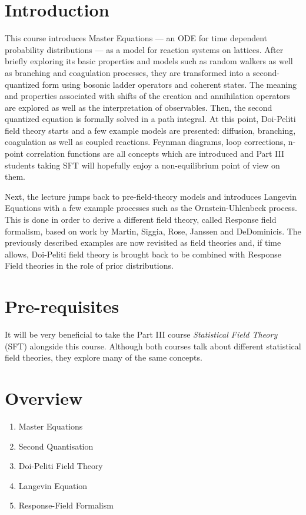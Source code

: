 \documentclass[a4paper,11pt]{article}
\begin{document}
	\maketitlepage
	\preliminaries

	\section*{Introduction}
	
	\noindent This course introduces Master Equations --- an ODE for time dependent probability distributions --- as a model for reaction systems on lattices. After briefly exploring its basic properties and models such as random walkers as well as branching and coagulation processes, they are transformed into a second-quantized form using bosonic ladder operators and coherent states. The meaning and properties associated with shifts of the creation and annihilation operators are explored as well as the interpretation of observables. Then, the second quantized equation is formally solved in a path integral. At this point, Doi-Peliti field theory starts and a few example models are presented: diffusion, branching, coagulation as well as coupled reactions. Feynman diagrams, loop corrections, n-point correlation functions are all concepts which are introduced and Part III students taking SFT will hopefully enjoy a non-equilibrium point of view on them.

	\noindent Next, the lecture jumps back to pre-field-theory models and introduces Langevin Equations with a few example processes such as the Ornstein-Uhlenbeck process. This is done in order to derive a different field theory, called Response field formalism, based on work by Martin, Siggia, Rose, Janssen and DeDominicis. The previously described examples are now revisited as field theories and, if time allows, Doi-Peliti field theory is brought back to be combined with Response Field theories in the role of prior distributions.

	\section*{Pre-requisites}

	It will be very beneficial to take the Part III course \emph{Statistical Field Theory} (SFT) alongside this course. Although both courses talk about different statistical field theories, they explore many of the same concepts.

	\newpage
	\section*{Overview}
	\begin{enumerate}
		\item Master Equations
		\item Second Quantisation
		\item Doi-Peliti Field Theory
		\item Langevin Equation
		\item Response-Field Formalism
	\end{enumerate}
\end{document}
